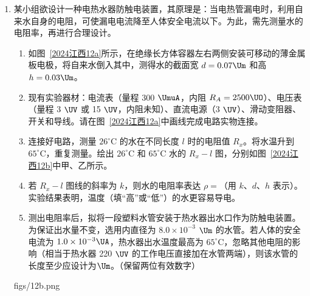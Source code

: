 \documentclass[\gkver]{gaokaozhenti}
\begin{document}
\begin{enumerate}
\item
某小组欲设计一种电热水器防触电装置，其原理是：当电热管漏电时，利用自来水自身的电阻，可使漏电电流降至人体安全电流以下。为此，需先测量水的电阻率，再进行合理设计。
\begin{enumerate}
	\item
	如图~\ref{2024江西12a}所示，在绝缘长方体容器左右两侧安装可移动的薄金属板电极，将自来水倒入其中，测得水的截面宽 $d = 0.07 \Um$ 和高 $h = 0.03 \Um$。
	\item
	现有实验器材：电流表（量程 300 $\UmuA$，内阻 $R_{A} = 2500 \UO$）、电压表（量程 3 $\UV$ 或 15 $\UV$，内阻未知）、直流电源（3 $\UV$）、滑动变阻器、开关和导线。请在图~\ref{2024江西12a}中画线完成电路实物连接\tkanswer[2cm]{}。
	\item
	连接好电路，测量 $26^{\circ}$C 的水在不同长度 $l$ 时的电阻值 $R_{x}$。将水温升到 $65^{\circ}$C，重复测量。绘出 $26^{\circ}$C 和 $65^{\circ}$C 水的 $R_{x} - l$ 图，分别如图~\ref{2024江西12b}中甲、乙所示。
	\item
	若 $R_{x} - l$ 图线的斜率为 $k$，则水的电阻率表达 $\rho =$\tkanswer[2cm]{}（用 $k$、$d$、$h$ 表示）。实验结果表明，温度\tkanswer[2cm]{}（填“高”或“低”）的水更容易导电。
	\item
	测出电阻率后，拟将一段塑料水管安装于热水器出水口作为防触电装置。为保证出水量不变，选用内直径为 $8.0\times10^{-3}$ $\Um$ 的水管。若人体的安全电流为 $1.0\times10^{-3} \UA$，热水器出水温度最高为 $65^{\circ}$C，忽略其他电阻的影响（相当于热水器 220 $\UV$ 的工作电压直接加在水管两端），则该水管的长度至少应设计为\tkanswer[2cm]{}$\Um$。（保留两位有效数字）
\end{enumerate}
{figs/12b.png}
\end{enumerate}
\end{document}
